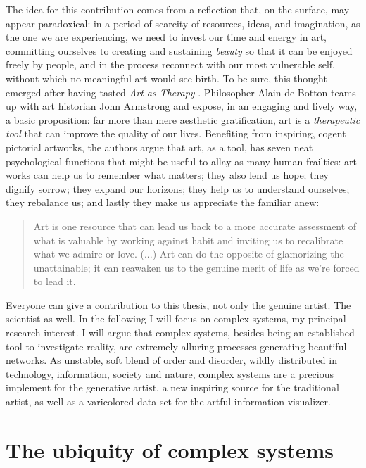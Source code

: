 \documentclass{article}
\begin{document}
The idea for this contribution comes from a reflection that, on the surface, may appear paradoxical: in a period of scarcity of resources, ideas, and imagination, as the one we are experiencing, we need to invest our time and energy in art, committing ourselves to creating and sustaining \textit{beauty} so that it can be enjoyed freely by people, and in the process reconnect with our most vulnerable self, without which no meaningful art would see birth. To be sure, this thought emerged after having tasted \textit{Art as Therapy} \cite{deBA13}. Philosopher Alain de Botton teams up with art historian John Armstrong and expose, in an engaging and lively way, a basic proposition: far more than mere aesthetic gratification, art is a \textit{therapeutic tool} that can improve the quality of our lives. Benefiting from inspiring, cogent pictorial artworks, the authors argue that art, as a tool, has seven neat psychological functions that might be useful to allay as many human frailties: art works can help us to remember what matters; they also lend us hope; they dignify sorrow; they expand our horizons; they help us to understand ourselves; they rebalance us; and lastly they make us appreciate the familiar anew: 

\begin{quote}
Art is one resource that can lead us back to a more accurate assessment of what is valuable by working against habit and inviting us to recalibrate what we admire or love. (...) Art can do the opposite of glamorizing the unattainable; it can reawaken us to the genuine merit of life as we're forced to lead it.
\end{quote}

Everyone can give a contribution to this thesis, not only the genuine artist. The scientist as well. In the following I will focus on complex systems, my principal research interest. I will argue that complex systems, besides being an established tool to investigate reality, are extremely alluring processes generating beautiful networks. As unstable, soft blend of order and disorder, wildly distributed in technology, information, society and nature, complex systems are a precious implement for the generative artist, a new inspiring source for the traditional artist, as well as a varicolored data set for the artful information visualizer.
      
\section{The ubiquity of complex systems}  
\end{document}
